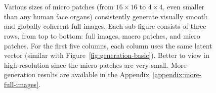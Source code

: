 \documentclass{article}
\begin{document}
        \begin{figure}[t!]
             \\[-0.8em]
             \\[-0.8em]
\caption{Various sizes of micro patches (from $16\times16$ to $4\times4$, even smaller than any human face organs) consistently generate visually smooth and globally coherent full images. Each sub-figure consists of three rows, from top to bottom: full images, macro patches, and micro patches. For the first five columns, each column uses the same latent vector (similar with Figure~\ref{fig:generation-basic}). Better to view in high-resolution since the micro patches are very small. More generation results are available in the Appendix~\ref{appendix:more-full-images}.}
            \label{fig:generation-crazy}
            \vspace{-0.5em}
        \end{figure}
        
\end{document}
